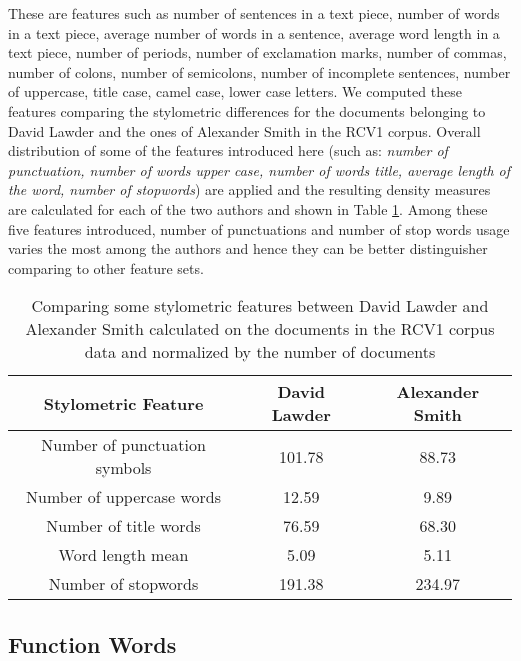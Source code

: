 These are features such as number of sentences in a text piece, number of words in a text piece, average number of words in a sentence, average word length in a text piece, number of periods, number of exclamation marks, number of commas, number of colons, number of semicolons, number of incomplete sentences, number of uppercase, title case, camel case, lower case letters. We computed these features comparing the stylometric differences for the documents belonging to David Lawder and the ones of Alexander Smith in the RCV1 corpus. Overall distribution of some of the features introduced here (such as: \textit{number of punctuation, number of words upper case, number of words title, average length of the word, number of stopwords}) are applied and the resulting density measures are calculated for each of the two authors and shown in Table \ref{tab:stylometricFeatRCV1}. Among these five features introduced, number of punctuations and number of stop words usage varies the most among the authors and hence they can be better distinguisher comparing to other feature sets.

\begin{table}[h!]
	\begin{center}  
		\caption[Comparing stylometric features of 2 authors in RCV1]{Comparing some stylometric features between David Lawder and Alexander Smith calculated on the documents in the RCV1 corpus data and normalized by the number of documents} 
		\label{tab:stylometricFeatRCV1}
		\begin{tabular}{|c | c | c |}
			\hline 
			Stylometric Feature & David Lawder & Alexander Smith \\
			\hline \hline
			Number of punctuation symbols & 101.78 & 88.73 \\ \hline
			Number of uppercase words & 12.59  & 9.89 \\ \hline
			Number of title words & 76.59 & 68.30 \\ \hline
			Word length mean & 5.09 & 5.11 \\ \hline
			Number of stopwords & 191.38 & 234.97 \\ \hline
		\end{tabular} 
	\end{center}
\end{table}

\subsection{Function Words}

